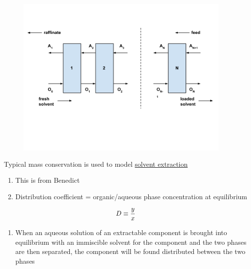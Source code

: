 \documentclass[aspectratio=1610,pdftex,dvipsnames,compress,xcolor={dvipsnames}]{beamer}
\begin{document}
\begin{frame}{}
    \begin{figure}
        \centering
        \includegraphics[width=0.95\textwidth]{purex.flow.jpg}
    \end{figure}
\end{frame}


\begin{frame}{Typical mass conservation is used to model \href{https://uidaho.pressbooks.pub/nuclearengineering/chapter/countercurrent-solvent-extraction/}{solvent extraction}}
    
    \begin{enumerate}[topsep=0pt,itemsep=18pt,leftmargin=*,label=(\arabic*)]
        \item[]This is from Benedict
        \item[]Distribution coefficient = organic/aqueous phase concentration at equilibrium
    \end{enumerate}

    \vspace*{\fill}

    \begin{equation}
        \LARGE
        D \equiv \frac{y}{x}
    \end{equation}

    \vspace*{\fill}

    \begin{enumerate}[topsep=0pt,itemsep=18pt,leftmargin=*,label=(\arabic*)]
        \item[]When an aqueous solution of an extractable component is brought into equilibrium with an immiscible solvent for the component and the two phases are then separated, the component will be found distributed between the two phases
    \end{enumerate}
\end{frame}
\end{document}
